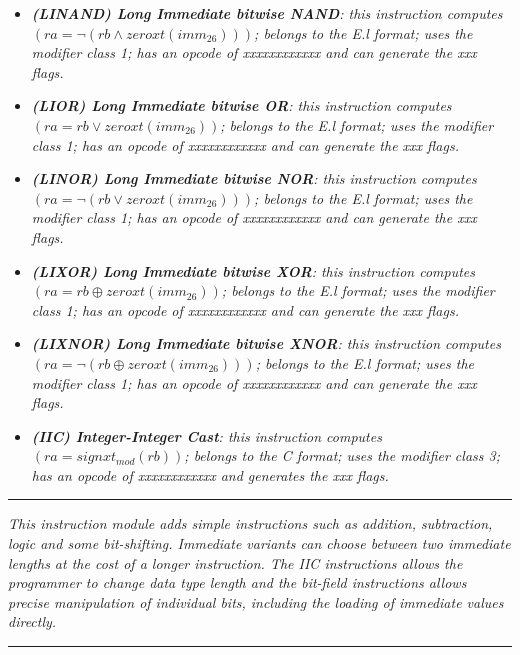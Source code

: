 \begin{multicols}{2}
\begin{itemize}
                \item \textit{\textbf{(LINAND) Long Immediate bitwise NAND}: this instruction computes \((ra = \neg(rb \wedge zeroxt(imm_{26})))\); belongs to the E.l format; uses the modifier class 1; has an opcode of xxxxxxxxxxxx and can generate the xxx flags.}

                \item \textit{\textbf{(LIOR) Long Immediate bitwise OR}: this instruction computes \((ra = rb \vee zeroxt(imm_{26}))\); belongs to the E.l format; uses the modifier class 1; has an opcode of xxxxxxxxxxxx and can generate the xxx flags.}

                \item \textit{\textbf{(LINOR) Long Immediate bitwise NOR}: this instruction computes \((ra = \neg(rb \vee zeroxt(imm_{26})))\); belongs to the E.l format; uses the modifier class 1; has an opcode of xxxxxxxxxxxx and can generate the xxx flags.}

                \item \textit{\textbf{(LIXOR) Long Immediate bitwise XOR}: this instruction computes \((ra = rb \oplus zeroxt(imm_{26}))\); belongs to the E.l format; uses the modifier class 1; has an opcode of xxxxxxxxxxxx and can generate the xxx flags.}

                \item \textit{\textbf{(LIXNOR) Long Immediate bitwise XNOR}: this instruction computes \((ra = \neg(rb \oplus zeroxt(imm_{26})))\); belongs to the E.l format; uses the modifier class 1; has an opcode of xxxxxxxxxxxx and can generate the xxx flags.}

                \item \textit{\textbf{(IIC) Integer-Integer Cast}: this instruction computes \((ra = signxt_{mod}(rb))\); belongs to the C format; uses the modifier class 3; has an opcode of xxxxxxxxxxxx and generates the xxx flags.}

            \end{itemize}

        \end{multicols}

    \par\noindent\rule{\textwidth}{0.4pt}
    \textit{This instruction module adds simple instructions such as addition, subtraction, logic and some bit-shifting. Immediate variants can choose between two immediate lengths at the cost of a longer instruction. The IIC instructions allows the programmer to change data type length and the bit-field instructions allows precise manipulation of individual bits, including the loading of immediate values directly.}
    \par\noindent\rule{\textwidth}{0.4pt}

